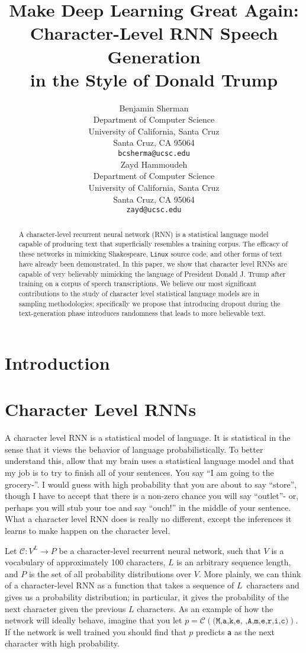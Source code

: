 \documentclass{article}
\title{Make Deep Learning Great Again: \\ Character-Level RNN Speech Generation \\ in the Style of Donald Trump}
\author{
  Benjamin Sherman \\
  Department of Computer Science\\
  University of California, Santa Cruz\\
  Santa Cruz, CA 95064 \\
  \texttt{bcsherma@ucsc.edu} \\
  \And
  Zayd Hammoudeh \\
  Department of Computer Science\\
  University of California, Santa Cruz\\
  Santa Cruz, CA 95064 \\
  \texttt{zayd@ucsc.edu} \\
}
\begin{document}

\maketitle

\begin{abstract}
  A character-level recurrent neural network (RNN) is a statistical language model capable of producing text that superficially resembles a training corpus. The efficacy of these networks in mimicking Shakespeare, \texttt{Linux} source code, and other forms of text have already been demonstrated. In this paper, we show that character level RNNs are capable of very believably mimicking the language of President Donald J. Trump after training on a corpus of speech transcriptions. We believe our most significant contributions to the study of character level statistical language models are in sampling methodologies; specifically we propose that introducing dropout during the text-generation phase introduces randomness that leads to more believable text.
\end{abstract}

\section{Introduction}


\section{Character Level RNNs}

A character level RNN is a statistical model of language. It is statistical in the sense that it views the behavior of language probabilistically. To better understand this, allow that my brain uses a statistical language model and that my job is to try to finish all of your sentences. You say ``I am going to the grocery-''. I would guess with high probability that you are about to say ``store'', though I have to accept that there is a non-zero chance you will say ``outlet''- or, perhaps you will stub your toe and say ``ouch!'' in the middle of your sentence. What a character level RNN does is really no different, except the inferences it learns to make happen on the character level.

Let $\mathcal{C} : V^L \rightarrow P$ be a character-level recurrent neural network, such that $V$ is a vocabulary of approximately 100 characters, $L$ is an arbitrary sequence length, and $P$ is the set of all probability distributions over $V$. More plainly, we can think of a character-level RNN as a function that takes a sequence of $L$~characters and gives us a probability distribution; in particular, it gives the probability of the next character given the previous $L$ characters. As an example of how the network will ideally behave, imagine that you let $p = \mathcal{C}(\texttt{(M,a,k,e, ,A,m,e,r,i,c)})$. If the network is well trained you should find that $p$ predicts \texttt{a} as the next character with high probability.
\end{document}
